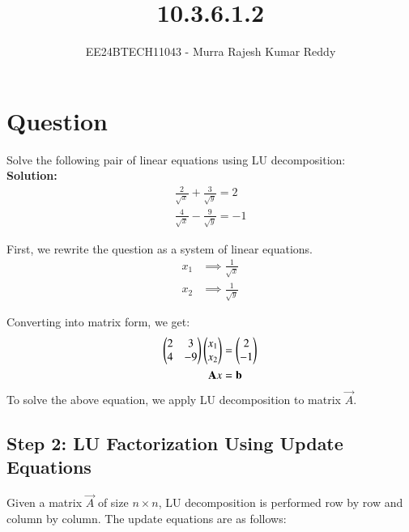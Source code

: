 \documentclass[journal]{IEEEtran}
\begin{document}

\vspace{3cm}

\title{10.3.6.1.2}
\author{EE24BTECH11043 - Murra Rajesh Kumar Reddy}
{\let\newpage\relax\maketitle}

\renewcommand{\thefigure}{\theenumi}
\renewcommand{\thetable}{\theenumi}
\setlength{\intextsep}{10pt} %

\renewcommand{\thetable}{\theenumi}

\section*{Question}
    Solve the following pair of linear equations using LU decomposition:\\
\textbf{Solution:}\\
\begin{align}
    \frac{2}{\sqrt{x}}+ \frac{3}{\sqrt{y}} = 2 \\
    \frac{4}{\sqrt{x}} - \frac{9}{\sqrt{y}} = -1
\end{align}

First, we rewrite the question as a system of linear equations.
\begin{align}
    x_1 &\implies \frac{1}{\sqrt{x}} \\
    x_2 &\implies \frac{1}{\sqrt{y}}
\end{align}

Converting into matrix form, we get:
\begin{align}
    \begin{pmatrix}2 & 3\\ 4 & -9\end{pmatrix}\begin{pmatrix}x_1 \\ x_2\end{pmatrix} &= \begin{pmatrix}2 \\-1\end{pmatrix} \\
    \mathbf{A}x &= \mathbf{b}
\end{align}
To solve the above equation, we apply LU decomposition to matrix \(\vec{A}\).

\subsection*{Step 2: LU Factorization Using Update Equations}
Given a matrix $\vec{A}$ of size $n \times n$, LU decomposition is performed row by row and column by column. The update equations are as follows:
\end{document}
